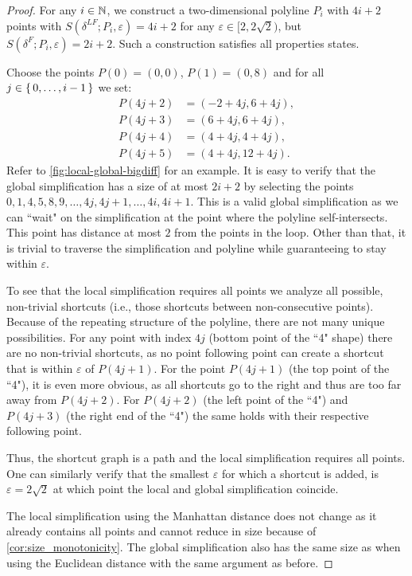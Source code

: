 \begin{proof}
	For any \(i \in \mathbb{N}\), we construct a two-dimensional polyline \(P_i\) with \(4 i + 2\) points with \(S(\delta^{LF}; P_i, \varepsilon) = 4i + 2\) for any \(\varepsilon \in [2, 2\sqrt{2})\), but \(S(\delta^F; P_i, \varepsilon) = 2i + 2\). Such a construction satisfies all properties states. 

	Choose the points \(P(0) = (0,0)\), \(P(1) = (0, 8)\) and for all \(j \in \set{0,\dots, i-1}\) we set:
	\begin{align*}
		P(4j+2) &= (-2 + 4j, 6 + 4j), \\
		P(4j+3) &= (6 + 4j, 6 + 4j), \\
		P(4j+4) &= (4 + 4j, 4 + 4j), \\
		P(4j+5) &= (4 + 4j, 12 + 4j).
	\end{align*}
	Refer to \cref{fig:local-global-bigdiff} for an example. It is easy to verify that the global simplification has a size of at most \(2i + 2\) by selecting the points \(0,1, 4, 5, 8, 9, \dots, 4j, 4j + 1, \dots, 4i, 4i+1\). This is a valid global simplification as we can ``wait" on the simplification at the point where the polyline self-intersects. This point has distance at most \(2\) from the points in the loop. Other than that, it is trivial to traverse the simplification and polyline while guaranteeing to stay within \(\varepsilon\). 

	To see that the local simplification requires all points we analyze all possible, non-trivial shortcuts (i.e., those shortcuts between non-consecutive points). Because of the repeating structure of the polyline, there are not many unique possibilities. For any point with index \(4j\) (bottom point of the ``4" shape) there are no non-trivial shortcuts, as no point following point can create a shortcut that is within \(\varepsilon\) of \(P(4j+1)\). For the point \(P(4j+1)\) (the top point of the ``4"), it is even more obvious, as all shortcuts go to the right and thus are too far away from \(P(4j+2)\). For \(P(4j+2)\) (the left point of the ``4") and \(P(4j+3)\) (the right end of the ``4") the same holds with their respective following point.

	Thus, the shortcut graph is a path and the local simplification requires all points. One can similarly verify that the smallest \(\varepsilon\) for which a shortcut is added, is \(\varepsilon = 2\sqrt2\) at which point the local and global simplification coincide. 

	The local simplification using the Manhattan distance does not change as it already contains all points and cannot reduce in size because of \cref{cor:size_monotonicity}. The global simplification also has the same size as when using the Euclidean distance with the same argument as before.
\end{proof}


